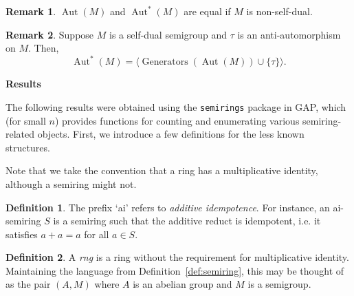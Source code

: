 \documentclass{article}
\theoremstyle{definition}
\newtheorem{definition}{Definition}
\newtheorem{remark}{Remark}
\begin{document}
\begin{remark}
    \(\operatorname{Aut}(M)\) and \(\operatorname{Aut}^*(M)\) are equal if \(M\) is non-self-dual.
\end{remark}

\begin{remark}
    Suppose \(M\) is a self-dual semigroup and \(\tau\) is an anti-automorphism on \(M\). Then, 
    \[\operatorname{Aut}^*(M) = \langle\operatorname{Generators}(\operatorname{Aut}(M)) \cup \{\tau\}\rangle.\]
\end{remark}
\vspace{3em}
\begin{center}
    \textbf{Results}
\end{center}
The following results were obtained using the \texttt{semirings} package in GAP, which (for small \(n\)) provides functions for counting and enumerating various semiring-related objects. First, we introduce a few definitions for the less known structures.

Note that we take the convention that a ring has a multiplicative identity, although a semiring might not.

\begin{definition}
    The prefix `ai' refers to \emph{additive idempotence}. For instance, an ai-semiring \(S\) is a semiring such that the additive reduct is idempotent, i.e. it satisfies \(a + a = a\) for all \(a\in S\).
\end{definition}
\begin{definition}
    A \emph{rng} is a ring without the requirement for multiplicative identity. Maintaining the language from Definition~\ref{def:semiring}, this may be thought of as the pair \((A, M)\) where \(A\) is an abelian group and \(M\) is a semigroup.
\end{definition}
\end{document}
